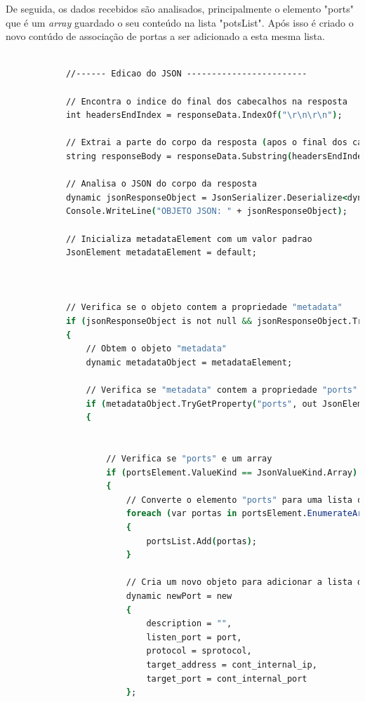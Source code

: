 De seguida, os dados recebidos são analisados, principalmente o elemento "ports"
que é um \textit{array} guardado o seu conteúdo na lista "potsList". Após isso
é criado o novo contúdo de associação de portas a ser adicionado a esta mesma lista.


\begin{lstlisting}[language=csh, caption={Editar o conteúdo Json}]

            //------ Edicao do JSON ------------------------

            // Encontra o indice do final dos cabecalhos na resposta
            int headersEndIndex = responseData.IndexOf("\r\n\r\n");

            // Extrai a parte do corpo da resposta (apos o final dos cabecalhos)
            string responseBody = responseData.Substring(headersEndIndex + 4);

            // Analisa o JSON do corpo da resposta
            dynamic jsonResponseObject = JsonSerializer.Deserialize<dynamic>(responseBody);
            Console.WriteLine("OBJETO JSON: " + jsonResponseObject);

            // Inicializa metadataElement com um valor padrao
            JsonElement metadataElement = default;

  

            // Verifica se o objeto contem a propriedade "metadata"
            if (jsonResponseObject is not null && jsonResponseObject.TryGetProperty("metadata", out metadataElement))
            {
                // Obtem o objeto "metadata"
                dynamic metadataObject = metadataElement;

                // Verifica se "metadata" contem a propriedade "ports"
                if (metadataObject.TryGetProperty("ports", out JsonElement portsElement))
                {
                    

                    // Verifica se "ports" e um array
                    if (portsElement.ValueKind == JsonValueKind.Array)
                    {
                        // Converte o elemento "ports" para uma lista de portas
                        foreach (var portas in portsElement.EnumerateArray())
                        {
                            portsList.Add(portas);
                        }

                        // Cria um novo objeto para adicionar a lista de portas
                        dynamic newPort = new
                        {
                            description = "",
                            listen_port = port,
                            protocol = sprotocol,
                            target_address = cont_internal_ip,
                            target_port = cont_internal_port
                        };


\end{lstlisting}
